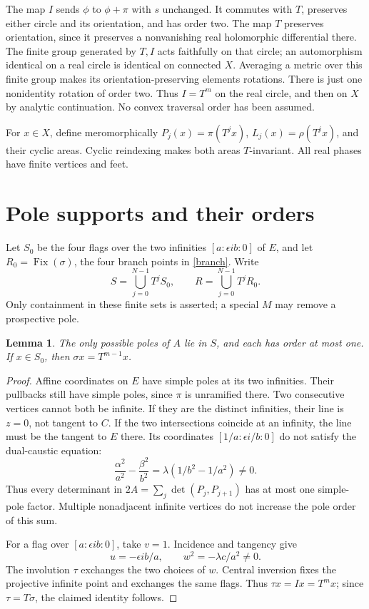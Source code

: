 \documentclass[11pt]{article}
\newtheorem{lemma}{Lemma}
\begin{document}
The map \(I\) sends \(\phi\) to \(\phi+\pi\) with \(s\) unchanged.
It commutes with \(T\), preserves either circle and its orientation,
and has order two. The map \(T\) preserves orientation, since it
preserves a nonvanishing real holomorphic differential there.
The finite group generated by \(T,I\) acts faithfully on that circle;
an automorphism identical on a real circle is identical on connected
\(X\). Averaging a metric over this finite group makes its
orientation-preserving elements rotations. There is just one
nonidentity rotation of order two. Thus \(I=T^m\) on the real circle,
and then on \(X\) by analytic continuation. No convex traversal
order has been assumed.

For \(x\in X\), define meromorphically
\(P_j(x)=\pi(T^jx)\), \(L_j(x)=\rho(T^jx)\), and their cyclic
areas. Cyclic reindexing makes both areas \(T\)-invariant.
All real phases have finite vertices and feet.

\section{Pole supports and their orders}
Let \(S_0\) be the four flags over the two infinities
\([a:\epsilon ib:0]\) of \(E\), and let
\(R_0=\operatorname{Fix}(\sigma)\), the four branch points in
\eqref{branch}. Write
\[
 S=\bigcup_{j=0}^{N-1}T^jS_0,\qquad
 R=\bigcup_{j=0}^{N-1}T^jR_0 .
\]
Only containment in these finite sets is asserted; a special \(M\)
may remove a prospective pole.

\begin{lemma}\label{polesA}
The only possible poles of \(A\) lie in \(S\), and each has order at
most one. If \(x\in S_0\), then
\(\sigma x=T^{m-1}x\).
\end{lemma}
\begin{proof}
Affine coordinates on \(E\) have simple poles at its two infinities.
Their pullbacks still have simple poles, since \(\pi\) is unramified
there. Two consecutive vertices cannot both be infinite. If they
are the distinct infinities, their line is \(z=0\), not tangent to \(C\).
If the two intersections coincide at an infinity, the line must be
the tangent to \(E\) there. Its coordinates
\([1/a:\epsilon i/b:0]\) do not satisfy the dual-caustic equation:
\[
 \frac{\alpha^2}{a^2}-\frac{\beta^2}{b^2}
 =\lambda(1/b^2-1/a^2)\ne0.
\]
Thus every determinant in \(2A=\sum_j\det(P_j,P_{j+1})\)
has at most one simple-pole factor. Multiple nonadjacent infinite
vertices do not increase the pole order of this sum.

For a flag over \([a:\epsilon ib:0]\), take \(v=1\).
Incidence and tangency give
\[
 u=-\epsilon ib/a,\qquad w^2=-\lambda c/a^2\ne0 .
\]
The involution \(\tau\) exchanges the two choices of \(w\).
Central inversion fixes the projective infinite point and exchanges
the same flags. Thus \(\tau x=Ix=T^mx\);
since \(\tau=T\sigma\), the claimed identity follows.
\end{proof}
\end{document}
